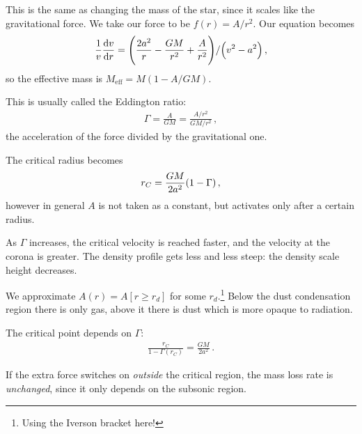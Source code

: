 \documentclass[main.tex]{subfiles}
\begin{document}
This is the same as changing the mass of the star, since it scales like the gravitational force. We take our force to be \(f(r) = A / r^2\). Our equation becomes 
%
\begin{align}
  \frac{1}{v} \dv{v}{r}  = \qty(\frac{2 a^2}{r} - \frac{GM}{r^2} + \frac{A}{r^2}) / \qty(v^2- a^2)
\,,
\end{align}
%
so the effective mass is \(M _{\text{eff}} = M ( 1- A / GM)\).

This is usually called the Eddington ratio: 
%
\begin{align}
  \Gamma = \frac{A}{GM} = \frac{A/r^2}{GM / r^2}
\,,
\end{align}
%
the acceleration of the force divided by the gravitational one.


The critical radius becomes 
%
\begin{align}
  r_C = \frac{GM}{2a^2} \qty(1 - \Gamma )
\,,
\end{align}
%
however in general \(A\) is not taken as a constant, but activates only after a certain radius.

As \(\Gamma \) increases, the critical velocity is reached faster, and the velocity at the corona is greater.
The density profile gets less and less steep: the density scale height decreases.

We approximate \(A(r) = A [r \geq r_d]\) for some \(r_d\).\footnote{Using the Iverson bracket here!}
Below the dust condensation region there is only gas, above it there is dust which is more opaque to radiation.

The critical point depends on \(\Gamma \): 
%
\begin{align}
  \frac{r_C}{1 - \Gamma (r_C)} = \frac{GM}{2 a^2}
\,.
\end{align}
%

If the extra force switches on \emph{outside} the critical region, the mass loss rate is \emph{unchanged}, since it only depends on the subsonic region.

\end{document}
